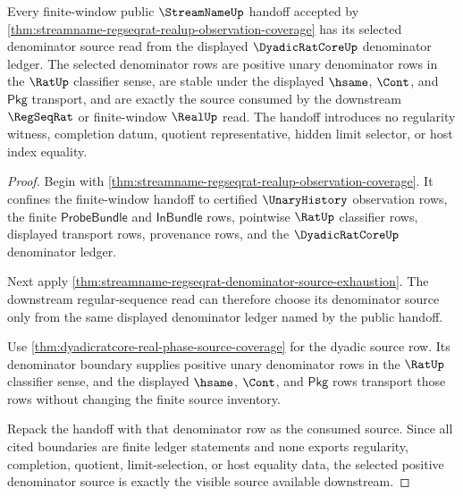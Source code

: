 \begin{theorem}
\label{thm:streamname-public-denominator-positive-source-fit}
Every finite-window public $\StreamNameUp$ handoff accepted by
\autoref{thm:streamname-regseqrat-realup-observation-coverage} has its selected
denominator source read from the displayed $\DyadicRatCoreUp$ denominator
ledger. The selected denominator rows are positive unary denominator rows in
the $\RatUp$ classifier sense, are stable under the displayed $\hsame$,
$\Cont$, and $\mathsf{Pkg}$ transport, and are exactly the source consumed by
the downstream $\RegSeqRat$ or finite-window $\RealUp$ read. The handoff
introduces no regularity witness, completion datum, quotient representative,
hidden limit selector, or host index equality.
\end{theorem}
\begin{proof}
Begin with
\autoref{thm:streamname-regseqrat-realup-observation-coverage}. It confines the
finite-window handoff to certified $\UnaryHistory$ observation rows, the
finite $\mathsf{ProbeBundle}$ and $\mathsf{InBundle}$ rows, pointwise $\RatUp$
classifier rows, displayed transport rows, provenance rows, and the
$\DyadicRatCoreUp$ denominator ledger.

Next apply
\autoref{thm:streamname-regseqrat-denominator-source-exhaustion}. The
downstream regular-sequence read can therefore choose its denominator source
only from the same displayed denominator ledger named by the public handoff.

Use \autoref{thm:dyadicratcore-real-phase-source-coverage} for the dyadic
source row. Its denominator boundary supplies positive unary denominator rows
in the $\RatUp$ classifier sense, and the displayed $\hsame$, $\Cont$, and
$\mathsf{Pkg}$ rows transport those rows without changing the finite source
inventory.

Repack the handoff with that denominator row as the consumed source. Since all
cited boundaries are finite ledger statements and none exports regularity,
completion, quotient, limit-selection, or host equality data, the selected
positive denominator source is exactly the visible source available downstream.
\end{proof}

